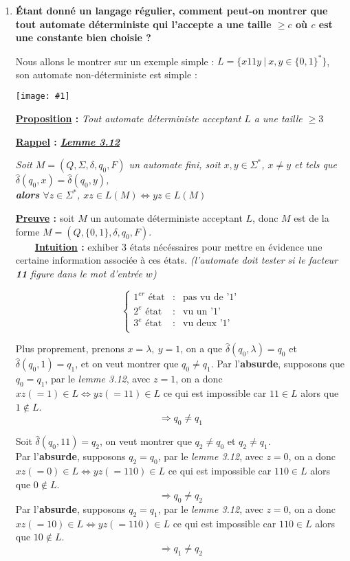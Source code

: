 \documentclass{article}
\newcommand{\term}[1]{\textit{\textcolor{maintitle}{#1}}}
\newcommand{\imgR}[2]{\begin{center}\texttt{[image: \#1]}\end{center}}
\begin{document}
\begin{sffamily}
\begin{enumerate}
\item \textbf{Étant donné un langage régulier, comment peut-on montrer que tout automate déterministe qui l'accepte a 
une taille $\geq c$ où $c$ est une constante bien choisie ?}

Nous allons le montrer sur un exemple simple : $L  = \{x11y\ |\ x,y \in \{0,1\}^* \}$, son automate non-déterministe
est simple : \imgR{img10.png}{200}

\textbf{\underline{Proposition} : }\textit{Tout automate déterministe acceptant $L$ a une taille $\geq 3$}

\textbf{\underline{Rappel} : \term{\underline{Lemme 3.12}}} \\
\begin{center}
\term{Soit $M = (Q,\Sigma,\delta,q_0,F)$ un automate fini, soit $x,y \in \Sigma^*$, $x \neq y$ et tels que
$\hat{\delta}(q_0,x) = \hat{\delta}(q_0,y)$, \textbf{\\alors} $\forall z \in \Sigma^*$, $xz \in L(M) \Leftrightarrow 
yz \in L(M)$}
\end{center}

\noindent \textbf{\underline{Preuve} : } soit $M$ un automate déterministe acceptant $L$, donc $M$ est de la forme
$M = (Q,\{0,1\},\delta,q_0,F)$.\\

$\qquad$\textbf{\underline{Intuition} : } exhiber 3 états nécéssaires pour mettre en évidence une certaine 
information associée à ces états. \textit{(l'automate doit tester si le facteur \textbf{11} figure dans le 
mot d'entrée $w$)}

$$\left\{\begin{array}{rll}
1^{er}\text{ état} & \text{:} & \text{pas vu de '1'} \\
2^{e}\text{ état} & \text{:} & \text{vu un '1'} \\
3^{e}\text{ état} & \text{:} & \text{vu deux '1'} \\
\end{array}\right.$$

Plus proprement, prenons $x = \lambda,\ y=1$, on a que $\hat\delta(q_0,\lambda) = q_0$ et $\hat\delta(q_0,1) = q_1$, 
et on veut montrer que $q_0 \neq q_1$. Par l'\textbf{absurde}, supposons que $q_0=q_1$, par le \term{lemme 3.12}, avec
$z=1$, on a donc $xz(=1)\in L \Leftrightarrow yz(=11) \in L$ ce qui est impossible car $11\in L$ alors que $1 \not\in 
L$.\\ $$\Rightarrow \boxed{q_0\neq q_1}$$

Soit $\hat{\delta}(q_0,11)=q_2$, on veut montrer que $q_2 \neq q_0$ et $q_2 \neq q_1$. \\ Par l'\textbf{absurde}, 
supposons $q_2=q_0$, par le \term{lemme 3.12}, avec $z=0$, on a donc $xz(=0)\in L \Leftrightarrow yz(=110) \in L$ ce
qui est impossible car $110 \in L$ alors que $0 \not\in L$. $$\Rightarrow \boxed{q_0\neq q_2}$$
Par l'\textbf{absurde}, 
supposons $q_2=q_1$, par le \term{lemme 3.12}, avec $z=0$, on a donc $xz(=10)\in L \Leftrightarrow yz(=110) \in L$ ce
qui est impossible car $110 \in L$ alors que $10 \not\in L$. $$\Rightarrow \boxed{q_1\neq q_2}$$


\end{enumerate}
\end{sffamily}
\end{document}
